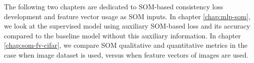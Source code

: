 The following two chapters are dedicated to SOM-based consistency loss development and feature vector usage as SOM inputs. In chapter \ref{chap:mlp-som}, we look at the supervised model using auxiliary SOM-based loss and its accuracy compared to the baseline model without this auxiliary information.
In chapter \ref{chap:som-fv-cifar}, we compare SOM qualitative and quantitative metrics in the case when image dataset is used, versus when feature vectors of images are used.